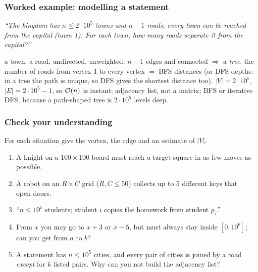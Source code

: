 \subsubsection*{Worked example: modelling a statement}

\begin{examplebox}
\emph{``The kingdom has $n\le 2\cdot10^5$ towns and $n-1$ roads; every town can be reached from the capital (town 1). For each town, how many roads separate it from the capital?''}

 a town.  a road, undirected, unweighted.  $n-1$ edges and connected $\Rightarrow$ a \emph{tree}.  the number of roads from vertex 1 to every vertex $=$ BFS distances (or DFS depths: in a tree the path is unique, so DFS gives the shortest distance too).  $|V|=2\cdot10^5$, $|E|=2\cdot10^5-1$, so $\mathcal{O}(n)$ is instant; adjacency list, not a matrix; BFS or iterative DFS, because a path-shaped tree is $2\cdot10^5$ levels deep.
\end{examplebox}

\subsubsection*{Check your understanding}

For each situation give the vertex, the edge and an estimate of $|V|$.
\begin{enumerate}[leftmargin=*]
    \item A knight on a $100\times100$ board must reach a target square in as few moves as possible.
    \item A robot on an $R\times C$ grid ($R,C\le 50$) collects up to 5 different keys that open doors.
    \item ``$n\le 10^5$ students; student $i$ copies the homework from student $p_i$.''
    \item From $x$ you may go to $x+3$ or $x-5$, but must always stay inside $[0,10^6]$; can you get from $a$ to $b$?
    \item A statement has $n\le 10^5$ cities, and every pair of cities is joined by a road \emph{except} for $k$ listed pairs. Why can you not build the adjacency list?
\end{enumerate}

